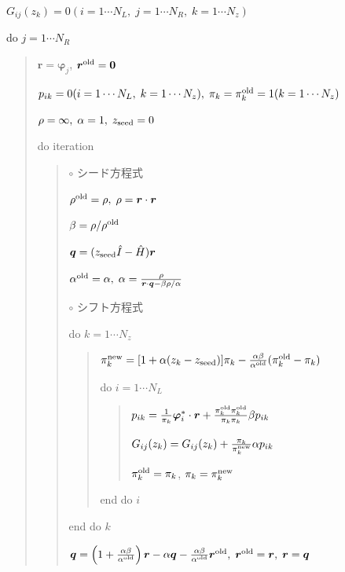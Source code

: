 \documentclass[letterpaper,10pt,dvipdfmx,openany]{sphinxmanual}
\begin{document}
\(G_{i j}(z_k) = 0 (i=1 \cdots N_L,\; j = 1 \cdots N_R,\; k=1 \cdots N_z)\)

do \(j = 1 \cdots N_R\)
\begin{quote}

\({\boldsymbol r} = {\boldsymbol \varphi_j}\), \({\boldsymbol r}^{\rm old} = {\bf 0}\)

\(p_{i k} = 0(i=1 \cdots N_L,\; k=1 \cdots N_z),\; \pi_k=\pi_k^{\rm old} = 1(k=1 \cdots N_z)\)

\(\rho = \infty,\; \alpha = 1,\; z_{\rm seed}=0\)

do iteration
\begin{quote}

\(\circ\) シード方程式

\(\rho^{\rm old} = \rho,\; \rho = {\boldsymbol r} \cdot {\boldsymbol r}\)

\(\beta = \rho / \rho^{\rm old}\)

\({\boldsymbol q} = (z_{\rm seed} {\hat I} - {\hat H}){\boldsymbol r}\)

\(\alpha^{\rm old} = \alpha,\; \alpha = \frac{\rho}{{\boldsymbol r}\cdot{\boldsymbol q} - \beta \rho / \alpha }\)

\(\circ\) シフト方程式

do \(k = 1 \cdots N_z\)
\begin{quote}

\(\pi_k^{\rm new} = [1+\alpha(z_k-z_{\rm seed})]\pi_k - \frac{\alpha \beta}{\alpha^{\rm old}}(\pi_k^{\rm old} - \pi_k)\)

do \(i = 1 \cdots N_L\)
\begin{quote}

\(p_{i k} = \frac{1}{\pi_k} {\boldsymbol \varphi}_i^* \cdot {\boldsymbol r} + \frac{\pi^{\rm old}_k \pi^{\rm old}_k}{\pi_k \pi_k} \beta p_{i k}\)

\(G_{i j}(z_k) = G_{i j}(z_k) + \frac{\pi_k}{\pi_k^{\rm new}} \alpha p_{i k}\)

\(\pi_k^{\rm old} = \pi_k\), \(\pi_k = \pi_k^{\rm new}\)
\end{quote}

end do \(i\)
\end{quote}

end do \(k\)

\({\boldsymbol q} = \left( 1 + \frac{\alpha \beta}{\alpha^{\rm old}} \right) {\boldsymbol r} - \alpha {\boldsymbol q} - \frac{\alpha \beta}{\alpha^{\rm old}} {\boldsymbol r}^{\rm old},\; {\boldsymbol r}^{\rm old} = {\boldsymbol r},\; {\boldsymbol r} = {\boldsymbol q}\)


\end{quote}
\end{quote}
\end{document}

